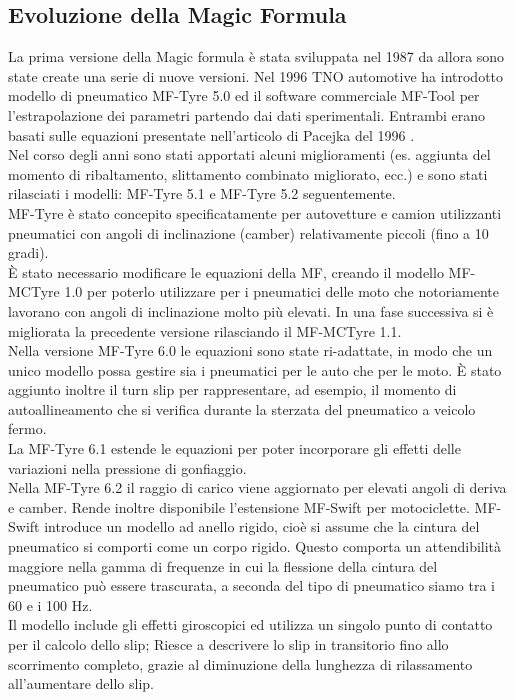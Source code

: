 \subsection{Evoluzione della Magic Formula}
La prima versione della Magic formula è stata sviluppata nel 1987 da allora sono state create una serie di nuove versioni.
Nel 1996 TNO automotive ha introdotto modello di pneumatico MF-Tyre 5.0 ed il software commerciale MF-Tool per l'estrapolazione dei parametri partendo dai dati sperimentali. Entrambi erano basati sulle equazioni presentate nell'articolo di Pacejka del 1996 \cite{Pacejka1997MagicFT}.\\ 
Nel corso degli anni sono stati apportati alcuni miglioramenti (es. aggiunta del
momento di ribaltamento, slittamento combinato migliorato, ecc.) e sono stati rilasciati i modelli: MF-Tyre 5.1 e MF-Tyre 5.2 seguentemente.\\ 
MF-Tyre è stato concepito specificatamente per autovetture e camion utilizzanti pneumatici con
angoli di inclinazione (camber) relativamente piccoli (fino a 10 gradi).\\
È stato necessario modificare le equazioni della MF, creando il modello MF-MCTyre 1.0 per poterlo utilizzare per i pneumatici delle moto che notoriamente lavorano con angoli di inclinazione molto più elevati. In una fase successiva si è migliorata la precedente versione rilasciando il MF-MCTyre 1.1.\\
Nella versione MF-Tyre 6.0 le equazioni sono state ri-adattate, in modo che un unico modello possa gestire sia i pneumatici per le auto che per le moto.
È stato aggiunto inoltre il turn slip per rappresentare, ad esempio, il momento di autoallineamento
che si verifica durante la sterzata del pneumatico a veicolo fermo.\\ 
La MF-Tyre 6.1 estende le equazioni per poter incorporare gli effetti delle variazioni nella pressione di gonfiaggio.\\
Nella MF-Tyre 6.2 il raggio di carico viene aggiornato per elevati angoli di deriva e camber. Rende inoltre disponibile l'estensione MF-Swift per motociclette. MF-Swift introduce un modello ad anello rigido, cioè si assume che la cintura del pneumatico si comporti come un corpo rigido. Questo comporta un attendibilità maggiore nella gamma di frequenze in cui la flessione della cintura del pneumatico può essere trascurata, a seconda del tipo di pneumatico siamo tra i 60 e i 100 Hz.\\ 
Il modello include gli effetti giroscopici ed utilizza un singolo punto di contatto per il calcolo dello slip; Riesce a descrivere lo slip in transitorio fino allo scorrimento completo, grazie al diminuzione della lunghezza di rilassamento all'aumentare dello slip. \\
